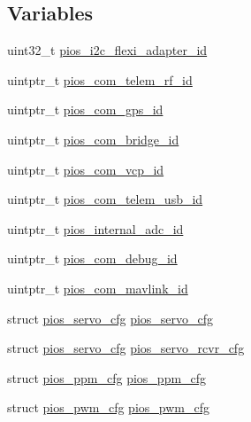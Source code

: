 \subsection*{\-Variables}
\begin{DoxyCompactItemize}
\item 
uint32\-\_\-t \hyperlink{group___copter_control_ga00c59288b3ddcecb262b920ef5ae6ce1}{pios\-\_\-i2c\-\_\-flexi\-\_\-adapter\-\_\-id}
\item 
uintptr\-\_\-t \hyperlink{group___copter_control_gae48e848f715b08971e23528feee79339}{pios\-\_\-com\-\_\-telem\-\_\-rf\-\_\-id}
\item 
uintptr\-\_\-t \hyperlink{group___copter_control_ga05dca72c42c6c2b33fa62b8ee0fcb2ea}{pios\-\_\-com\-\_\-gps\-\_\-id}
\item 
uintptr\-\_\-t \hyperlink{group___copter_control_gac040f05fa048688ee0269c2768698a14}{pios\-\_\-com\-\_\-bridge\-\_\-id}
\item 
uintptr\-\_\-t \hyperlink{group___copter_control_gaaeb3e0d65ed5c6e7b921c54e1ad905db}{pios\-\_\-com\-\_\-vcp\-\_\-id}
\item 
uintptr\-\_\-t \hyperlink{group___copter_control_ga513cc36d72b76de2fcb75ff233a79a4a}{pios\-\_\-com\-\_\-telem\-\_\-usb\-\_\-id}
\item 
uintptr\-\_\-t \hyperlink{group___copter_control_gafb354658d0ba22815d8632d97c062c0b}{pios\-\_\-internal\-\_\-adc\-\_\-id}
\item 
uintptr\-\_\-t \hyperlink{group___copter_control_ga14dc9e3d330b80a37a9699c2112358e0}{pios\-\_\-com\-\_\-debug\-\_\-id}
\item 
uintptr\-\_\-t \hyperlink{group___copter_control_gabdefeb92517c08b2db19b764db941de9}{pios\-\_\-com\-\_\-mavlink\-\_\-id}
\item 
struct \hyperlink{structpios__servo__cfg}{pios\-\_\-servo\-\_\-cfg} \hyperlink{group___copter_control_ga57a87ef16d7949a9cc3589efc8d88a28}{pios\-\_\-servo\-\_\-cfg}
\item 
struct \hyperlink{structpios__servo__cfg}{pios\-\_\-servo\-\_\-cfg} \hyperlink{group___copter_control_gaa111328ef9a12c806ed1c24b93d4f663}{pios\-\_\-servo\-\_\-rcvr\-\_\-cfg}
\item 
struct \hyperlink{structpios__ppm__cfg}{pios\-\_\-ppm\-\_\-cfg} \hyperlink{group___copter_control_ga256c8c512691a72ee2ed15d1a9041810}{pios\-\_\-ppm\-\_\-cfg}
\item 
struct \hyperlink{structpios__pwm__cfg}{pios\-\_\-pwm\-\_\-cfg} \hyperlink{group___copter_control_ga7587f8e174df90bef8cec1edfa9e14c1}{pios\-\_\-pwm\-\_\-cfg}

\end{DoxyCompactItemize}
